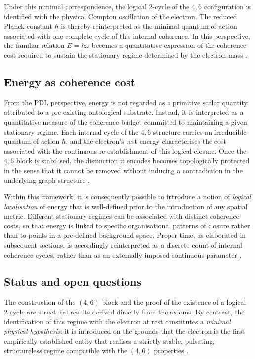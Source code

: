 \documentclass{article}
\begin{document}
Under this minimal correspondence, the logical 2-cycle of the \(4,6\) configuration is identified with the physical Compton oscillation of the electron. The reduced Planck constant \(\hbar\) is thereby reinterpreted as the minimal quantum of action associated with one complete cycle of this internal coherence. In this perspective, the familiar relation \(E = \hbar \omega\) becomes a quantitative expression of the coherence cost required to sustain the stationary regime determined by the electron mass \citep{PDL_Main_2026}.

\subsection{Energy as coherence cost}
\label{subsec:energy_coherence}

From the PDL perspective, energy is not regarded as a primitive scalar quantity attributed to a pre-existing ontological substrate. Instead, it is interpreted as a quantitative measure of the coherence budget committed to maintaining a given stationary regime. Each internal cycle of the \(4,6\) structure carries an irreducible quantum of action \(\hbar\), and the electron’s rest energy characterises the cost associated with the continuous re-establishment of this logical closure. Once the \(4,6\) block is stabilised, the distinction it encodes becomes topologically protected in the sense that it cannot be removed without inducing a contradiction in the underlying graph structure \citep{PDL_Main_2026,PDL_intro}.

Within this framework, it is consequently possible to introduce a notion of \emph{logical localisation} of energy that is well-defined prior to the introduction of any spatial metric. Different stationary regimes can be associated with distinct coherence costs, so that energy is linked to specific organisational patterns of closure rather than to points in a pre-defined background space. Proper time, as elaborated in subsequent sections, is accordingly reinterpreted as a discrete count of internal coherence cycles, rather than as an externally imposed continuous parameter \citep{PDL_Main_2026,PDL_position}.

\subsection{Status and open questions}
\label{subsec:electron_status}

The construction of the \((4,6)\) block and the proof of the existence of a logical 2-cycle are structural results derived directly from the axioms. By contrast, the identification of this regime with the electron at rest constitutes a \emph{minimal physical hypothesis}: it is introduced on the grounds that the electron is the first empirically established entity that realises a strictly stable, pulsating, structureless regime compatible with the \((4,6)\) properties \citep{PDL_intro}.
\end{document}
